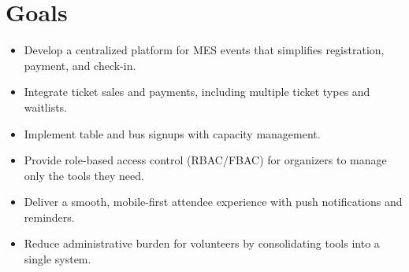 \documentclass{article}
\begin{document}
\section{Goals}

\begin{itemize}
    \item Develop a centralized platform for MES events that simplifies registration, payment, and check-in.
    \item Integrate ticket sales and payments, including multiple ticket types and waitlists.
    \item Implement table and bus signups with capacity management.
    \item Provide role-based access control (RBAC/FBAC) for organizers to manage only the tools they need.
    \item Deliver a smooth, mobile-first attendee experience with push notifications and reminders.
    \item Reduce administrative burden for volunteers by consolidating tools into a single system.
\end{itemize}
\end{document}
